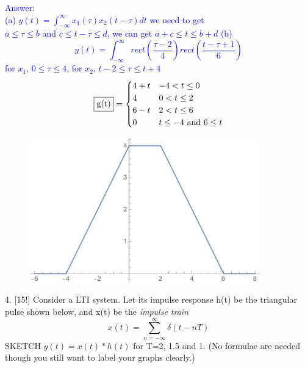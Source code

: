 \documentclass[12pt,a4paper]{article}
\begin{document}
\begin{tcolorbox}
\normalsize
\textcolor{blue}{Answer:\\
(a) $y(t)=\int_{-\infty}^\infty x_1(\tau)x_2(t-\tau)dt$
we need to get\\
$a\leq\tau\leq b$ and $c\leq t-\tau \leq d$, we can get $a+c\leq t\leq b+d$
(b) $$y(t)=\int_{-\infty}^\infty rect(\frac{\tau-2}{4}) rect(\frac{t-\tau+1}{6})$$ 
for $x_1$, $0\leq\tau\leq 4$, for $x_2$, $t-2\leq\tau\leq t+4$
$$\fbox{g(t)}=
\begin{cases}
    4+t & -4<t \leq 0 \\
    4 & 0<t \leq 2 \\
    6-t & 2<t \leq 6 \\
    0 & t\leq -4 \text{ and } 6\leq t
\end{cases}$$
\begin{figure}[H]
    \centering
    \includegraphics[width=10cm]{3b.jpg}
\end{figure}
}
\end{tcolorbox}

\newpage
\begin{tcolorbox}[colback = white]
4. [15!] Consider a LTI system. Let its impulse response h(t) be the triangular pulse shown below, and x(t) be the \textit{impulse train}\\
$$
x(t)=\sum_{n=-\infty}^{\infty} \delta(t-n T)
$$
SKETCH $y(t)=x(t)*h(t)$ for T=2, 1.5 and 1. (No formulae are needed though you still want to label your graphs clearly.)\\
\begin{center}
\end{center}
\end{tcolorbox}
\end{document}
